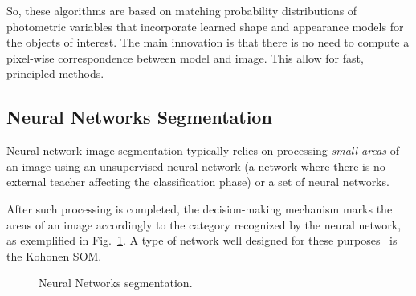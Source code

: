 So, these algorithms are based on matching probability distributions of photometric variables that incorporate learned shape and appearance models for the objects of interest. The main innovation is that there is no need to compute a pixel-wise correspondence between model and image. This allow for fast, principled methods.

\subsection{Neural Networks Segmentation}

Neural network image segmentation typically relies on processing \emph{small areas} of an image using an unsupervised neural network (a network where there is no external teacher affecting the classification phase) or a set of neural networks.

After such processing is completed, the decision-making mechanism marks the areas of an image accordingly to the category recognized by the neural network, as exemplified in Fig.~\ref{fig:nn_human_head}. A type of network well designed for these purposes~\cite{reyes:2000} is the Kohonen \ac{SOM}.

\begin{figure}
\centering
{} \quad
%
\caption{Neural Networks segmentation.}
\label{fig:nn_human_head}
\end{figure}

